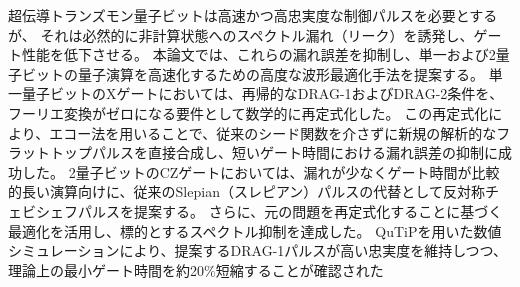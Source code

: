 \begin{jabstract}
  超伝導トランズモン量子ビットは高速かつ高忠実度な制御パルスを必要とするが、
  それは必然的に非計算状態へのスペクトル漏れ（リーク）を誘発し、ゲート性能を低下させる。
  本論文では、これらの漏れ誤差を抑制し、単一および2量子ビットの量子演算を高速化するための高度な波形最適化手法を提案する。
  単一量子ビットのXゲートにおいては、再帰的なDRAG-1およびDRAG-2条件を、フーリエ変換がゼロになる要件として数学的に再定式化した。
  この再定式化により、エコー法を用いることで、従来のシード関数を介さずに新規の解析的なフラットトップパルスを直接合成し、短いゲート時間における漏れ誤差の抑制に成功した。
  2量子ビットのCZゲートにおいては、漏れが少なくゲート時間が比較的長い演算向けに、従来のSlepian（スレピアン）パルスの代替として反対称チェビシェフパルスを提案する。
  さらに、元の問題を再定式化することに基づく最適化を活用し、標的とするスペクトル抑制を達成した。
  QuTiPを用いた数値シミュレーションにより、提案するDRAG-1パルスが高い忠実度を維持しつつ、理論上の最小ゲート時間を約20\%短縮することが確認された
\end{jabstract}
